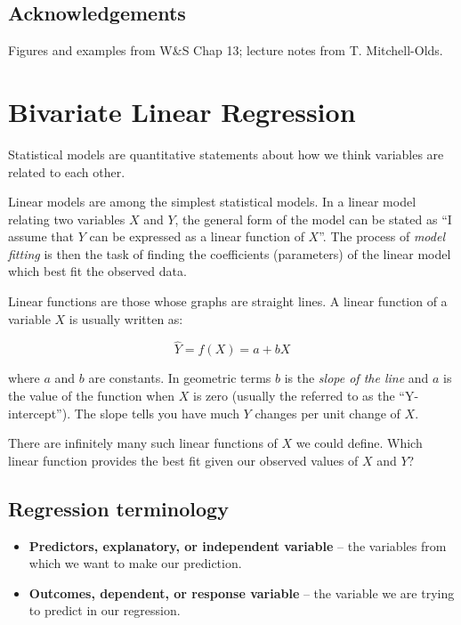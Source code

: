 \documentclass[]{book}
\theoremstyle{definition}
\theoremstyle{definition}
\theoremstyle{definition}
\theoremstyle{remark}
\begin{document}
\hypertarget{acknowledgements}{%
\section*{Acknowledgements}\label{acknowledgements}}

Figures and examples from W\&S Chap 13; lecture notes from T.
Mitchell-Olds.

\hypertarget{bivariate-linear-regression}{%
\chapter{Bivariate Linear
Regression}\label{bivariate-linear-regression}}

Statistical models are quantitative statements about how we think
variables are related to each other.

Linear models are among the simplest statistical models. In a linear
model relating two variables \(X\) and \(Y\), the general form of the
model can be stated as ``I assume that \(Y\) can be expressed as a
linear function of \(X\)''. The process of \emph{model fitting} is then
the task of finding the coefficients (parameters) of the linear model
which best fit the observed data.

Linear functions are those whose graphs are straight lines. A linear
function of a variable \(X\) is usually written as:

\[
 \hat{Y} = f(X) = a + bX
\]

where \(a\) and \(b\) are constants. In geometric terms \(b\) is the
\emph{slope of the line} and \(a\) is the value of the function when
\(X\) is zero (usually the referred to as the ``Y-intercept''). The
slope tells you have much \(Y\) changes per unit change of \(X\).

There are infinitely many such linear functions of \(X\) we could
define. Which linear function provides the best fit given our observed
values of \(X\) and \(Y\)?

\hypertarget{regression-terminology}{%
\section{Regression terminology}\label{regression-terminology}}

\begin{itemize}
\item
  \textbf{Predictors, explanatory, or independent variable} -- the
  variables from which we want to make our prediction.
\item
  \textbf{Outcomes, dependent, or response variable} -- the variable we
  are trying to predict in our regression.
\end{itemize}
\end{document}
